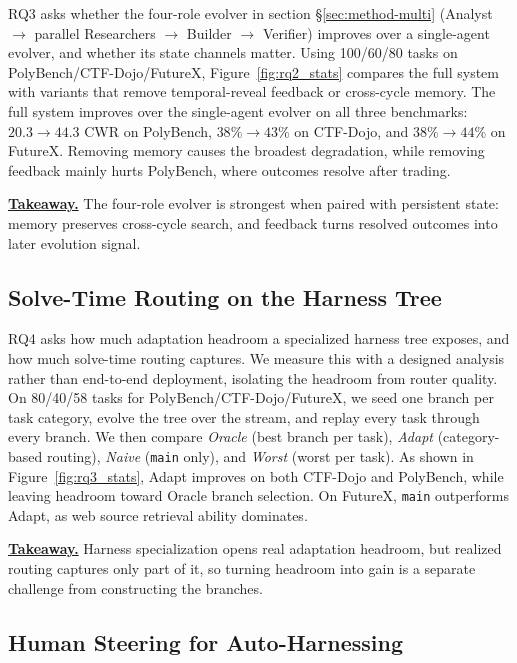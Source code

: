 \documentclass[11pt]{article}
\theoremstyle{plain}
\begin{document}
RQ3 asks whether the four-role evolver in section \S\ref{sec:method-multi} (Analyst $\to$ parallel Researchers $\to$ Builder $\to$ Verifier) improves over a single-agent evolver, and whether its state channels matter. Using 100/60/80 tasks on PolyBench/CTF-Dojo/FutureX, Figure~\ref{fig:rq2_stats} compares the full system with variants that remove temporal-reveal feedback or cross-cycle memory. The full system improves over the single-agent evolver on all three benchmarks: $20.3 \to 44.3$ CWR on PolyBench, $38\% \to 43\%$ on CTF-Dojo, and $38\% \to 44\%$ on FutureX. Removing memory causes the broadest degradation, while removing feedback mainly hurts PolyBench, where outcomes resolve after trading. 

\noindent\underline{\textbf{Takeaway.}} The four-role evolver is strongest when paired with persistent state: memory preserves cross-cycle search, and feedback turns resolved outcomes into later evolution signal.



\subsection{Solve-Time Routing on the Harness Tree}
\label{sec:navloss}

RQ4 asks how much adaptation headroom a specialized harness tree exposes, and how much solve-time routing captures. We measure this with a designed analysis rather than end-to-end deployment, isolating the headroom from router quality. On 80/40/58 tasks for PolyBench/CTF-Dojo/FutureX, we seed one branch per task category, evolve the tree over the stream, and replay every task through every branch. We then compare \emph{Oracle} (best branch per task), \emph{Adapt} (category-based routing), \emph{Naive} (\texttt{main} only), and \emph{Worst} (worst per task). As shown in Figure~\ref{fig:rq3_stats}, Adapt improves on both CTF-Dojo and PolyBench, while leaving headroom toward Oracle branch selection. On FutureX, \texttt{main} outperforms Adapt, as web source retrieval ability dominates.


\noindent\underline{\textbf{Takeaway.}} Harness specialization opens real adaptation headroom, but realized routing captures only part of it, so turning headroom into gain is a separate challenge from constructing the branches.

\subsection{Human Steering for Auto-Harnessing}
\label{sec:hitl}
\end{document}
